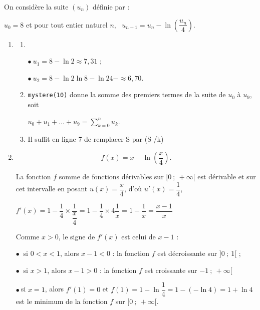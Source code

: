 \medskip

On considère la suite $\left(u_n\right)$ définie par : 

\begin{center} $u_0 = 8$ \:  et pour tout entier naturel \:\:$n,\:\:~u_{n+1} = u_n -\ln\left(\dfrac{u_n}{4}\right)$.\end{center}

\begin{enumerate}
\item 
	\begin{enumerate}
		\item ~
		
$\bullet~u_1 = 8 - \ln 2 \approx 7,31$ ;
		
$\bullet~u_2 = 8 - \ln 2  \ln {8 - \ln 2}{4}- \approx 6,70$.

		\item 












	

\texttt{mystere(10)} donne la somme des premiers termes de la suite de $u_0$ à $u_9$, soit 

$u_0 + u_1 + \ldots + u_9 = \displaystyle\sum_{k=0}^n u_k$.
		\item 
Il suffit en ligne 7 de remplacer S par (S /k)
	\end{enumerate}
\item 

\[ f(x) = x - \ln\left(\dfrac{x}{4}\right).\]













	

	

La fonction $f$ somme de fonctions dérivables sur $[0~;~+\infty[$ est dérivable et sur cet intervalle en posant $u(x) = \dfrac x4$, d'où $u'(x) = \dfrac14$,

$f'(x) = 1 - \dfrac14 \times \dfrac{1}{\dfrac x4} = 1 - \dfrac14 \times 4 \dfrac 1x  = 1 - \dfrac 1x  = \dfrac{x - 1}{x}$

Comme $x > 0$, le signe de $f'(x)$ est celui de $x - 1$ :

$\bullet~$ si $0< x < 1$, alors $x - 1 < 0$  : la fonction $f$ est décroissante sur $]0~;~1[$ ;

$\bullet~$ si $x > 1$, alors $x - 1 > 0$ : la fonction $f$ est croissante sur $-1~;~+ \infty[$

$\bullet~$si $x = 1$, alors $f'(1) = 0$ et $f(1) = 1 - \ln \dfrac14 = 1 - (-\ln 4) = 1 + \ln 4$ est le minimum de la fonction $f$ sur $[0~;~+ \infty[$.
\end{enumerate}

